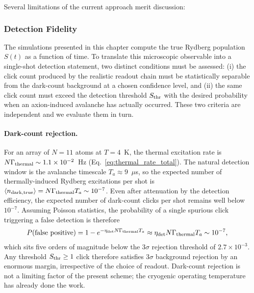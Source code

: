 Several limitations of the current approach merit discussion:

\subsubsection{Detection Fidelity}
\label{sec:detection_fidelity}

The simulations presented in this chapter compute the true Rydberg population $S(t)$ as a function of time. To translate this microscopic observable into a single-shot detection statement, two distinct conditions must be assessed: (i) the click count produced by the realistic readout chain must be statistically separable from the dark-count background at a chosen confidence level, and (ii) the same click count must exceed the detection threshold $S_{\rm thr}$ with the desired probability when an axion-induced avalanche has actually occurred. These two criteria are independent and we evaluate them in turn.

\paragraph{Dark-count rejection.}
For an array of $N=11$ atoms at $T = 4$~K, the thermal excitation rate is $N\Gamma_{\rm thermal} \sim 1.1 \times 10^{-2}$~Hz (Eq.~\eqref{eq:thermal_rate_total}). The natural detection window is the avalanche timescale $T_a \approx 9$~$\mu$s, so the expected number of thermally-induced Rydberg excitations per shot is $\langle n_{\rm dark, true}\rangle = N\Gamma_{\rm thermal}T_a \sim 10^{-7}$. Even after attenuation by the detection efficiency, the expected number of dark-count clicks per shot remains well below $10^{-7}$. Assuming Poisson statistics, the probability of a single spurious click triggering a false detection is therefore
\begin{equation}
    P(\text{false positive}) = 1 - e^{-\eta_{\rm det} N \Gamma_{\rm thermal} T_a} \approx \eta_{\rm det} N \Gamma_{\rm thermal} T_a \sim 10^{-7},
\end{equation}
which sits five orders of magnitude below the $3\sigma$ rejection threshold of $2.7 \times 10^{-3}$. Any threshold $S_{\rm thr} \geq 1$ click therefore satisfies $3\sigma$ background rejection by an enormous margin, irrespective of the choice of readout. Dark-count rejection is not a limiting factor of the present scheme; the cryogenic operating temperature has already done the work.

